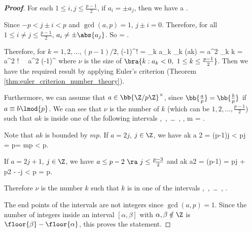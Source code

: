 \begin{proof}[\bf Proof]
For each $1\leq i,j\leq \frac{p-1}2$, if $a_i = \pm a_j$, then we have
\be
{}a  .
\ee

Since $-p < j\pm i< p$ and $\gcd(a,p)=1$, $j\pm i = 0$. Therefore, for all $1\leq i\neq j \leq \frac{p-1}2$, $a_i\neq \pm \abs{a_j}$. So 
\be
{} = .
\ee

Therefore, for $k = 1,2,\dots, (p-1)/2$, 
\be
(-1)^\nu {}! = \prod_k a_k \equiv \prod_k (ak) = a^{2} \prod_k k  = a^{2} !  \ \ra\ a^{2} \equiv (-1)^\nu {}
\ee
where $\nu$ is the size of $\bra{k:a_k <0,\ 1\leq k\leq \frac{p-1}2}$. Then we have the required result by applying Euler's criterion (Theorem \ref{thm:euler_criterion_number_theory}).

Furthermore, we can assume that $a\in \bb{\Z/p\Z}^\times$, since $\bb{\frac ap} = \bb{\frac bp}$ if $a\equiv b  \lmod{p}$. We can see that $\nu$ is the number of $k$ (which can be $1,2,\dots,\frac{p-1}2$) such that $ak$ is inside one of the following intervals
\be
{},\ ,\ \dots\ , , \qquad m = .
\ee

Note that $ak$ is bounded by $mp$. If $a = 2j$, $j\in\Z$, we have
\be
ak \leq a 2 = (p-1)j < pj = p= mp < p.
\ee

If $a=2j+1 $, $j\in \Z$, we have $a\leq p-2 \ \ra\ j\leq \frac{p-3}2$ and
\be
ak \leq a2 = (p-1) = pj + \frac p2 -  -j < p = p.
\ee

Therefore $\nu$ is the number $k$ such that $k$ is in one of the intervals
\be
{},\ ,\ \dots\ , .
\ee 

The end points of the intervals are not integers since $\gcd(a,p) =1$. Since the number of integers inside an interval $[\alpha,\beta]$ with $\alpha,\beta\notin\Z$ is $\floor{\beta} - \floor{\alpha}$, this proves the statement.
\end{proof}

